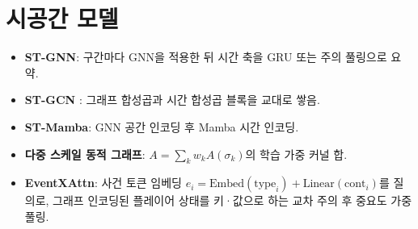 
\section{시공간 모델}
\label{sec:model-st}

\begin{itemize}[leftmargin=1.5em]
  \item \textbf{ST-GNN}: 구간마다 GNN을 적용한 뒤 시간 축을 GRU 또는 주의 풀링으로 요약.
  \item \textbf{ST-GCN} \cite{yan2018spatial}: 그래프 합성곱과 시간 합성곱 블록을 교대로 쌓음.
  \item \textbf{ST-Mamba}: GNN 공간 인코딩 후 Mamba 시간 인코딩.
  \item \textbf{다중 스케일 동적 그래프}: $A = \sum_k w_k A(\sigma_k)$의 학습 가중 커널 합.
  \item \textbf{EventXAttn}: 사건 토큰 임베딩 $e_i = \mathrm{Embed}(\mathrm{type}_i) + \mathrm{Linear}(\mathrm{cont}_i)$를 질의로, 그래프 인코딩된 플레이어 상태를 키·값으로 하는 교차 주의 후 중요도 가중 풀링.
\end{itemize}
